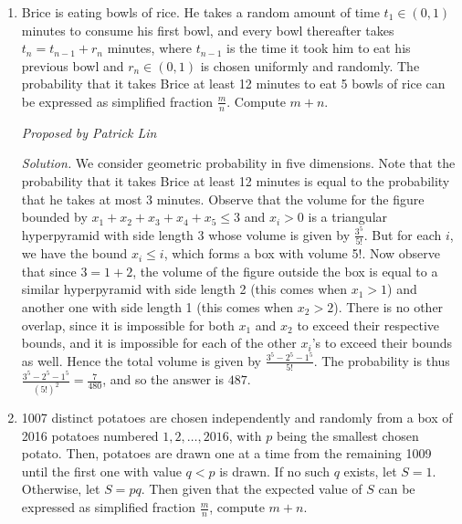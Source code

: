 \documentclass[10pt]{article}
\newcommand{\proposed}[1]
{
\vspace{5pt}
\noindent\textit{Proposed by #1}
}
\newcommand{\solution}
{
\vspace{5pt}
\noindent\textit{Solution.}\qquad
}
\begin{document}
\begin{enumerate}
\proposed{Patrick Lin}

\solution We find the expected number of people who mount their horse successfully. Number the horses from left to right $1, 2, \dots, 8$ and label their owners with the same number. Note that when person $i$ moves, the only way for him to mount his horse is if he is the first of $i$ people (namely, those with labels $1, 2, \dots, i$) to move. Hence person $i$ mounts his horse with $\tfrac{1}{i}$ probability. Since we have eight people, the expected number of people who mount their horse is thus $\sum_{i=1}^8 \tfrac{1}{i} = H_8 = \tfrac{761}{280}$. The expected number of people who scurry home is hence
\[8 - \frac{761}{280} = \frac{1479}{280},\]
and so the answer is $\boxed{1759}$.

\item Brice is eating bowls of rice. He takes a random amount of time $t_1 \in (0,1)$ minutes to consume his first bowl, and every bowl thereafter takes $t_n = t_{n-1} + r_n$ minutes, where $t_{n-1}$ is the time it took him to eat his previous bowl and $r_n \in (0,1)$ is chosen uniformly and randomly. The probability that it takes Brice at least 12 minutes to eat 5 bowls of rice can be expressed as simplified fraction $\tfrac{m}{n}$. Compute $m+n$.

\proposed{Patrick Lin}

\solution We consider geometric probability in five dimensions. Note that the probability that it takes Brice at least 12 minutes is equal to the probability that he takes at most 3 minutes. Observe that the volume for the figure bounded by $x_1 + x_2 + x_3 + x_4 + x_5 \le 3$ and $x_i > 0$ is a triangular hyperpyramid with side length 3 whose volume is given by $\frac{3^5}{5!}$. But for each $i$, we have the bound $x_i \le i$, which forms a box with volume 5!. Now observe that since $3 = 1 + 2$, the volume of the figure outside the box is equal to a similar hyperpyramid with side length 2 (this comes when $x_1 > 1$) and another one with side length 1 (this comes when $x_2 > 2$). There is no other overlap, since it is impossible for both $x_1$ and $x_2$ to exceed their respective bounds, and it is impossible for each of the other $x_i$’s to exceed their bounds as well. Hence the total volume is given by $\frac{3^5 - 2^5 - 1^5}{5!}$. The probability is thus $\frac{3^5 - 2^5 - 1^5}{(5!)^2} = \frac{7}{480}$, and so the answer is $\boxed{487}$.

\item 1007 distinct potatoes are chosen independently and randomly from a box of 2016 potatoes numbered $1, 2, \dots, 2016$, with $p$ being the smallest chosen potato. Then, potatoes are drawn one at a time from the remaining 1009 until the first one with value $q < p$ is drawn. If no such $q$ exists, let $S = 1$. Otherwise, let $S = pq$. Then given that the expected value of $S$ can be expressed as simplified fraction $\tfrac{m}{n}$, compute $m+n$.


\end{enumerate}
\end{document}
